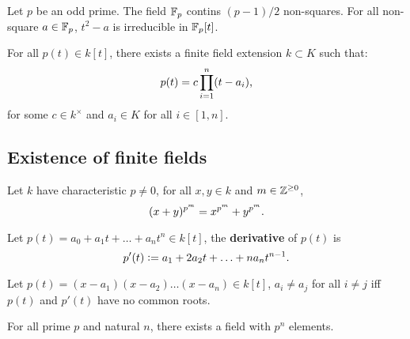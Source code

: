 \documentclass[../Year2.tex]{subfiles}
\begin{document}
\begin{lemma}
    Let $p$ be an odd prime. The field $\mathbb{F}_p$ contins $(p-1)/2$ non-squares. For all non-square $a\in\mathbb{F}_p$, $t^2-a$ is irreducible in $\mathbb{F}_p[t]$.
\end{lemma}

\begin{theorem}
    For all $p(t)\in k[t]$, there exists a finite field extension $k\subset K$ such that: \[
        p(t)=c\prod_{i=1}^n(t-a_i)
        \text{\textcolor{black}{,}}
    \] for some $c\in k^\times$ and $a_i\in K$ for all $i\in[1,n]$.
\end{theorem}

\subsection{Existence of finite fields}

\begin{theorem}
    Let $k$ have characteristic $p\neq 0$, for all $x,y\in k$ and $m\in\mathbb{Z}^{\geq 0}$, \[
        (x+y)^{p^m}=x^{p^m}+y^{p^m}
        \text{\textcolor{black}{.}}
    \]
\end{theorem}

\vspace{-30pt}

\begin{definition}[Derivative]
    Let $p(t)= a_0 + a_1t + \ldots + a_nt^n\in k[t]$, the \textbf{derivative} of $p(t)$ is \[
        p'(t):= a_1 + 2a_2t + \ldots + na_nt^{n-1}
        \text{\textcolor{black}{.}}
    \]
\end{definition}

\begin{lemma}
    Let $p(t)=(x-a_1)(x-a_2)\ldots(x-a_n)\in k[t]$, $a_i\neq a_j$ for all $i\neq j$ iff $p(t)$ and $p'(t)$ have no common roots.
\end{lemma}

\begin{theorem}
    For all prime $p$ and natural $n$, there exists a field with $p^n$ elements.
\end{theorem}
\end{document}
